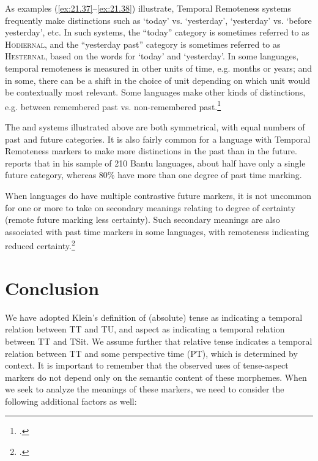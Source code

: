 As examples (\ref{ex:21.37}--\ref{ex:21.38}) illustrate, Temporal Remoteness systems frequently make distinctions such as ‘today’ vs. ‘yesterday’, ‘yesterday’ vs. ‘before yesterday’, etc. In such systems, the “today” category is sometimes referred to as \textsc{Hodiernal}, and the “yesterday past” category is sometimes referred to as \textsc{Hesternal}, based on the  words for ‘today’ and ‘yesterday’. In some languages, temporal remoteness is measured in other units of time, e.g. months or years; and in some, there can be a shift in the choice of unit depending on which unit would be contextually most relevant. Some languages make other kinds of distinctions, e.g. between remembered past vs. non-remembered past.\footnote{\citet{Botne2012}.}



The  and  systems illustrated above are both symmetrical, with equal numbers of past and future categories. It is also fairly common for a language with Temporal Remoteness markers to make more distinctions in the past than in the future. \citet{Nurse2008} reports that in his sample of 210 {Bantu} languages, about half have only a single future category, whereas 80\% have more than one degree of past time marking. 



When languages do have multiple contrastive future markers, it is not uncommon for one or more to take on secondary meanings relating to degree of certainty (remote future marking less certainty). Such secondary meanings are also associated with past time markers in some languages, with remoteness indicating reduced certainty.\footnote{\citet{Botne2012,Nurse2008}.}


\section{Conclusion}\label{sec:21.6}

We have adopted Klein’s definition of (absolute) tense as indicating a temporal relation between TT and TU, and aspect as indicating a temporal relation between TT and TSit. We assume further that relative tense indicates a temporal relation between TT and some perspective time (PT), which is determined by context. It is important to remember that the observed uses of tense-aspect markers do not depend only on the semantic content of these morphemes. When we seek to analyze the meanings of these markers, we need to consider the following additional factors as well:


